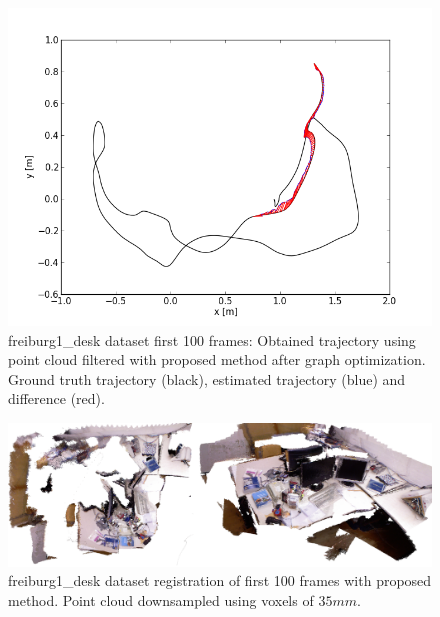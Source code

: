 \begin{figure}[H]
\begin{center}
\includegraphics[scale=0.75]{images/freiburg1_desk_1_100_optimized.png}
\caption{freiburg1\_desk dataset first 100 frames: Obtained trajectory using point cloud filtered with proposed method after graph optimization. Ground truth trajectory (black), estimated trajectory (blue) and difference (red).}
\end{center}
\end{figure}

\begin{figure}[H]
\begin{center}
\includegraphics[scale=0.2]{images/freiburg1_desk.png}
\caption{freiburg1\_desk dataset registration of first 100 frames with proposed method. Point cloud downsampled using voxels of $35mm$.}
\end{center}
\end{figure}


